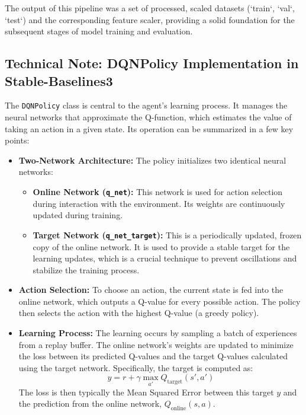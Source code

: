 The output of this pipeline was a set of processed, scaled datasets (`train`, `val`, `test`) and the corresponding feature scaler, providing a solid foundation for the subsequent stages of model training and evaluation.


\subsection*{Technical Note: DQNPolicy Implementation in Stable-Baselines3}

The \texttt{DQNPolicy} class is central to the agent's learning process. It manages the neural networks that approximate the Q-function, which estimates the value of taking an action in a given state. Its operation can be summarized in a few key points:

\begin{itemize}
    \item \textbf{Two-Network Architecture:} The policy initializes two identical neural networks:
    \begin{itemize}
        \item \textbf{Online Network (\texttt{q\_net}):} This network is used for action selection during interaction with the environment. Its weights are continuously updated during training.
        \item \textbf{Target Network (\texttt{q\_net\_target}):} This is a periodically updated, frozen copy of the online network. It is used to provide a stable target for the learning updates, which is a crucial technique to prevent oscillations and stabilize the training process.
    \end{itemize}

    \item \textbf{Action Selection:} To choose an action, the current state is fed into the online network, which outputs a Q-value for every possible action. The policy then selects the action with the highest Q-value (a greedy policy).

    \item \textbf{Learning Process:} The learning occurs by sampling a batch of experiences from a replay buffer. The online network's weights are updated to minimize the loss between its predicted Q-values and the target Q-values calculated using the target network. Specifically, the target is computed as:
    \[ y = r + \gamma \max_{a'} Q_{\text{target}}(s', a') \]
    The loss is then typically the Mean Squared Error between this target $y$ and the prediction from the online network, $Q_{\text{online}}(s, a)$.
\end{itemize}

